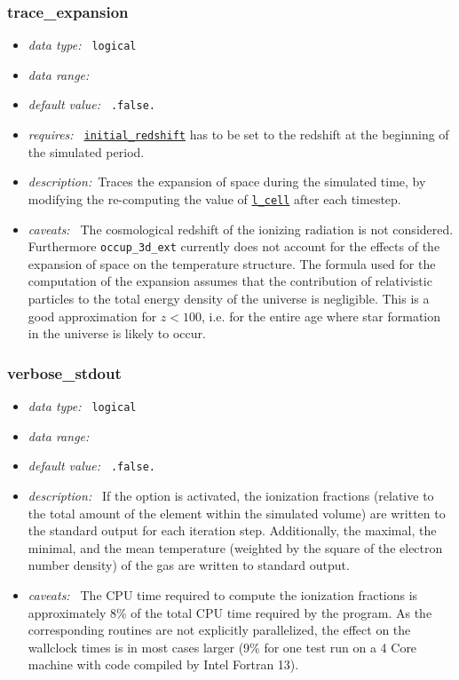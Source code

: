 \documentclass[a4paper,10pt]{article}
\begin{document}
\subsubsection{trace\_expansion}
\label{opt:traceexpansion}
\begin{itemize}
 \item \textit{data type:~} \texttt{logical}
 \item \textit{data range:~}
 \item \textit{default value:~} \texttt{.false.}
 \item \textit{requires:~} 
  \texttt{\hyperref[opt:initialredshift]{initial\_redshift}} has to be set to 
  the redshift at the beginning of the simulated period. 
 \item \textit{description:~}Traces the expansion of space during the simulated 
  time, by modifying the re-computing the value of 
  \texttt{\hyperref[opt:lcell]{l\_cell}} after each timestep.
 \item \textit{caveats:~} The cosmological redshift of the ionizing radiation 
  is not considered.
  Furthermore \texttt{occup\_3d\_ext} currently does not account for the effects 
  of the expansion of space on the temperature structure.
  The formula used for the computation of the expansion assumes that the 
  contribution of relativistic particles to the total energy density of the 
  universe is negligible. This is a good approximation for $z<100$, i.e. for 
  the entire age where star formation in the universe is likely 
  to occur. 
\end{itemize}

\subsubsection{verbose\_stdout}
\label{opt:verbosestdout}
\begin{itemize}
 \item \textit{data type:~} \texttt{logical}
 \item \textit{data range:~}
 \item \textit{default value:~} \texttt{.false.}
 \item \textit{description:~} If the option is activated, the ionization 
  fractions (relative to the total amount of the element within the simulated
  volume) are written to the standard output for each iteration step.
  Additionally, the maximal, the minimal,  and the mean temperature (weighted 
  by the square of the electron number density) of the gas are written to 
  standard output.
 \item \textit{caveats:~} The CPU time required to compute the 
 ionization fractions is approximately 8\% of the total CPU time required by 
 the program. As the corresponding routines are not explicitly parallelized,
 the effect on the wallclock times is in most cases larger (9\% for one test 
 run on a 4 Core machine with code compiled by Intel Fortran 13). 
\end{itemize}
\end{document}
